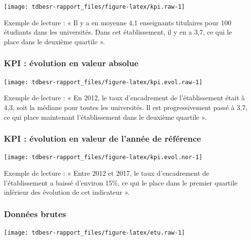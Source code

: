 \documentclass[12pt,french,]{article}
\begin{document}
\begin{center}\texttt{[image: tdbesr-rapport\_files/figure-latex/kpi.raw-1]} \end{center}

Exemple de lecture : « Il y a en moyenne 4,1 enseignants titulaires pour
100 étudiants dans les universités. Dans cet établissement, il y en a
3,7, ce qui le place dans le deuxième quartile ».

\hypertarget{kpi-uxe9volution-en-valeur-absolue}{%
\subsubsection{KPI : évolution en valeur
absolue}\label{kpi-uxe9volution-en-valeur-absolue}}

\begin{center}\texttt{[image: tdbesr-rapport\_files/figure-latex/kpi.evol.raw-1]} \end{center}

Exemple de lecture : « En 2012, le taux d'encadrement de l'établissement
était à 4,3, soit la médiane pour toutes les universités. Il est
progressivement passé à 3,7, ce qui place maintenant l'établissement
dans le deuxième quartile ».

\hypertarget{kpi-uxe9volution-en-valeur-de-lannuxe9e-de-ruxe9fuxe9rence}{%
\subsubsection{KPI : évolution en valeur de l'année de
référence}\label{kpi-uxe9volution-en-valeur-de-lannuxe9e-de-ruxe9fuxe9rence}}

\begin{center}\texttt{[image: tdbesr-rapport\_files/figure-latex/kpi.evol.nor-1]} \end{center}

Exemple de lecture : « Entre 2012 et 2017, le taux d'encadrement de
l'établissement a baissé d'environ 15\%, ce qui le place dans le premier
quartile inférieur des évolution de cet indicateur ».

\hypertarget{donnuxe9es-brutes}{%
\subsubsection{Données brutes}\label{donnuxe9es-brutes}}

\begin{center}\texttt{[image: tdbesr-rapport\_files/figure-latex/etu.raw-1]} \end{center}
\end{document}
